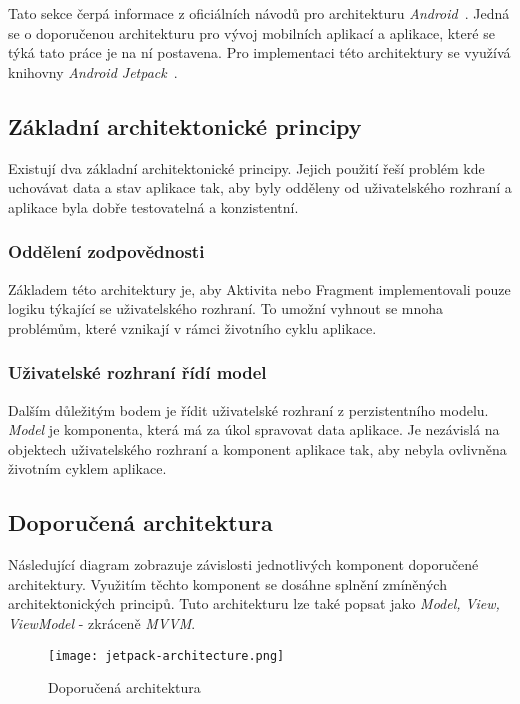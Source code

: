  Tato sekce čerpá informace z oficiálních návodů pro architekturu \emph{Android}~. Jedná se o doporučenou architekturu pro vývoj mobilních aplikací a aplikace, které se týká tato práce je na ní postavena. Pro implementaci této architektury se využívá knihovny \emph{Android Jetpack}~.

    \subsection{Základní architektonické principy}
    Existují dva základní architektonické principy. Jejich použití řeší problém kde uchovávat data a stav aplikace tak, aby byly odděleny od uživatelského rozhraní a aplikace byla dobře testovatelná a konzistentní.

        \subsubsection{Oddělení zodpovědnosti}
        Základem této architektury je, aby Aktivita nebo Fragment implementovali pouze logiku týkající se uživatelského rozhraní. To umožní vyhnout se mnoha problémům, které vznikají v rámci životního cyklu aplikace.

        \subsubsection{Uživatelské rozhraní řídí model}
        Dalším důležitým bodem je řídit uživatelské rozhraní z perzistentního modelu. \emph{Model} je komponenta, která má za úkol spravovat data aplikace. Je nezávislá na objektech uživatelského rozhraní a komponent aplikace tak, aby nebyla ovlivněna životním cyklem aplikace.

        \newpage
        \subsection{Doporučená architektura}
        Následující diagram zobrazuje závislosti jednotlivých komponent doporučené architektury. Využitím těchto komponent se dosáhne splnění zmíněných architektonických principů. Tuto architekturu lze také popsat jako \emph{Model, View, ViewModel} - zkráceně \emph{MVVM}.

        \begin{figure}[h!]
            \centering
            \vspace{0.5cm}
            \texttt{[image: jetpack-architecture.png]}
            \caption[Architektura aplikace]{Doporučená architektura~\cite{app-architecture-guide}}
            \label{diagram:jetpack_arch}
        \end{figure}
        
